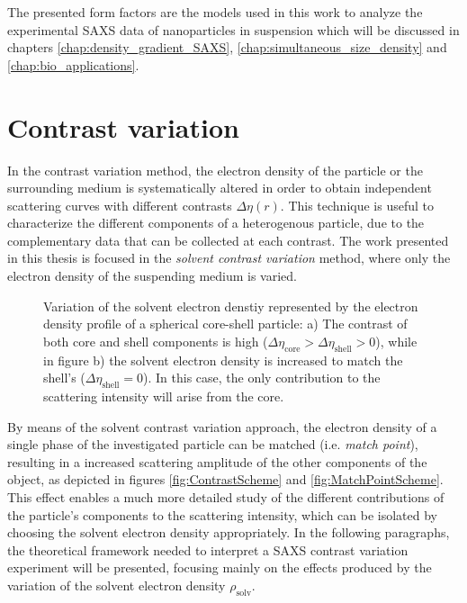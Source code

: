 The presented form factors are the models used in this work to analyze the experimental SAXS data of nanoparticles in suspension which will be discussed in chapters \ref{chap:density_gradient_SAXS}, \ref{chap:simultaneous_size_density} and \ref{chap:bio_applications}.

\section{Contrast variation}
\label{sec:contrast_variation_theory}

In the contrast variation method, the electron density of the particle or the surrounding medium is systematically altered in order to obtain independent scattering curves with different contrasts $\Delta \eta (r)$. This technique is useful to characterize the different components of a heterogenous particle, due to the complementary data that can be collected at each contrast. The work presented in this thesis is focused in the \emph{solvent contrast variation} method, where only the electron density of the suspending medium is varied.

\begin{figure}%
	\centering
	\caption{Variation of the solvent electron denstiy represented by the electron density profile of a spherical core-shell particle: a) The contrast of both core and shell components is high ($\Delta\eta_{\text{core}} > \Delta\eta_{\text{shell}} > 0$), while in figure b) the solvent electron density is increased to match the shell's ($\Delta\eta_{\text{shell}} = 0$). In this case, the only contribution to the scattering intensity will arise from the core.}
\end{figure}


By means of the solvent contrast variation approach, the electron density of a single phase of the investigated particle can be matched (i.e. \emph{match point}), resulting in a increased scattering amplitude of the other components of the object, as depicted in figures \ref{fig:ContrastScheme} and \ref{fig:MatchPointScheme}. This effect enables a much more detailed study of the different contributions of the particle's components to the scattering intensity, which can be isolated by choosing the solvent electron density appropriately. In the following paragraphs, the theoretical framework needed to interpret a SAXS contrast variation experiment will be presented, focusing mainly on the effects produced by the variation of the solvent electron density $\rho_{\text{solv}}$.

